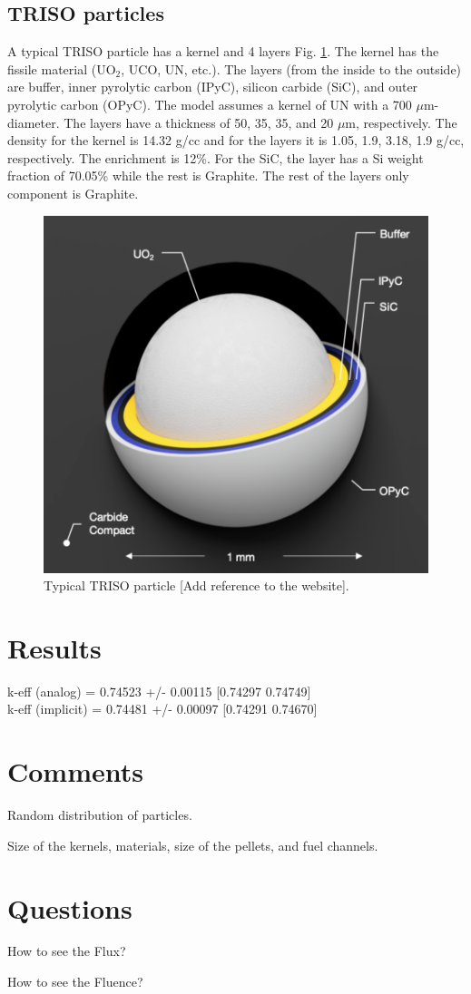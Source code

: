 \documentclass[11pt,letterpaper]{article}
\begin{document}
\subsection{TRISO particles}

A typical TRISO particle has a kernel and 4 layers Fig. \ref{fig:triso}. The kernel has the fissile material (UO$_2$, UCO, UN, etc.). The layers (from the inside to the outside) are buffer, inner pyrolytic carbon (IPyC), silicon carbide (SiC), and outer pyrolytic carbon (OPyC).
The model assumes a kernel of UN with a 700 $\mu$m-diameter. The layers have a thickness of 50, 35, 35, and 20 $\mu$m, respectively.
The density for the kernel is 14.32 g/cc and for the layers it is 1.05, 1.9, 3.18, 1.9 g/cc, respectively. The enrichment is 12\%. For the SiC, the layer has a Si weight fraction of 70.05\% while the rest is Graphite. The rest of the layers only component is Graphite.

\begin{figure}[H]
	\centering
	\includegraphics[width=0.5\linewidth]{figures/triso1.png}
	\hfill
	\caption{Typical TRISO particle [Add reference to the website].}
	\label{fig:triso}
\end{figure}

\section{Results}

k-eff (analog)    = 0.74523 +/- 0.00115  [0.74297  0.74749]\\
\noindent
k-eff (implicit)  = 0.74481 +/- 0.00097  [0.74291  0.74670]

\section{Comments}

\begin{description}[font=$\bullet$\scshape\bfseries]
	\item[] Random distribution of particles. 
    \item[]	Size of the kernels, materials, size of the pellets, and fuel channels.
\end{description}

\section{Questions}

\begin{description}[font=$\bullet$\scshape\bfseries]
	\item[] How to see the Flux?
	\item[]	How to see the Fluence?
\end{description}

\pagebreak


\end{document}
